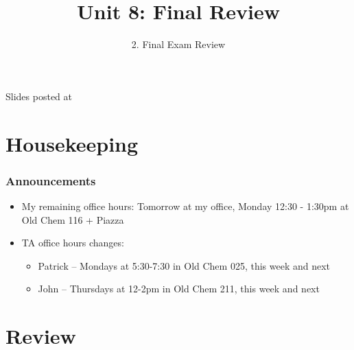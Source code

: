 \documentclass[11pt,containsverbatim,handout,xcolor=xelatex,dvipsnames,table]{beamer}
\title{Unit 8: Final Review}
\subtitle{2. Final Exam Review}
\author{\CourseName}
\date{}
\institute{\InstituteName}
\begin{document}



\begin{frame}[plain]

\titlepage

\vfill

{\scriptsize {} \hfill Slides posted at  \webURL{\CourseSite}}

\addtocounter{framenumber}{-1} 

\end{frame}


\section{Housekeeping}


\begin{frame}
\frametitle{Announcements}

\begin{itemize}

\item My remaining office hours: Tomorrow at my office, Monday 12:30 - 1:30pm at Old Chem 116 + Piazza

\item TA office hours changes:
\begin{itemize}
\item Patrick -- Mondays at 5:30-7:30 in Old Chem 025, this week and next
\item John -- Thursdays at 12-2pm in Old Chem 211, this week and next
\end{itemize}

\end{itemize}

\end{frame}


\section{Review}

\end{document}
